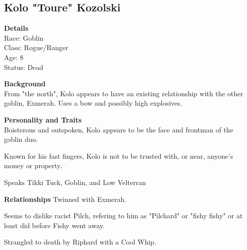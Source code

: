 \subsection{Kolo "Toure" Kozolski}
\textbf{Details}\\
Race: Goblin\\
Class: Rogue/Ranger\\
Age: 8\\
Status: Dead\bigskip

\textbf{Background}\\
From "the north", Kolo appears to have an existing relationship with the other goblin, Exmerah. Uses a bow and possibly high explosives.\bigskip

\textbf{Personality and Traits}\\
Boisterous and outspoken, Kolo appears to be the face and frontman of the goblin duo.\smallskip

Known for his fast fingers, Kolo is not to be trusted with, or near, anyone's money or property.\smallskip

Speaks Tikki Tuck, Goblin, and Low Velterran\smallskip

\textbf{Relationships}
Twinned with Exmerah.

Seems to dislike racist Pilch, refering to him as "Pilchard" or "fishy fishy" or at least did before Fishy went away.\smallskip

Strangled to death by Riphard with a Cool Whip.
